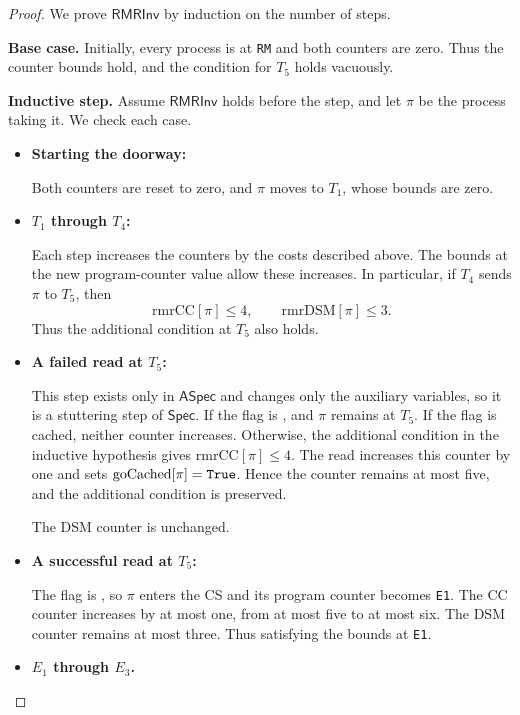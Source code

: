 \documentclass[12pt]{amsproc}
\begin{document}
\begin{proof}
We prove $\mathsf{RMRInv}$ by induction on the number of steps.

\textbf{Base case.}
Initially, every process is at \texttt{RM} and both counters are zero. Thus the counter bounds hold, and the condition for $T_5$ holds vacuously.

\textbf{Inductive step.}
Assume $\mathsf{RMRInv}$ holds before the step, and let $\pi$ be the process taking it. We check each case.

\begin{itemize}
    \item \textbf{Starting the doorway: }

    Both counters are reset to zero, and $\pi$ moves to $T_1$, whose bounds are zero.

    \item \textbf{$T_1$ through $T_4$:}

    Each step increases the counters by the costs described above. The bounds at the new program-counter value allow these increases. In particular, if $T_4$ sends $\pi$ to
    $T_5$, then
    \[
        \mathrm{rmrCC}[\pi]\le 4,
        \qquad
        \mathrm{rmrDSM}[\pi]\le 3.
    \]
    Thus the additional condition at $T_5$ also holds.

    \item \textbf{A failed read at $T_5$:}

    This step exists only in $\mathsf{ASpec}$ and changes only the auxiliary variables, so it is a stuttering step of $\mathsf{Spec}$. If the flag is \False, and $\pi$ remains at $T_5$. If the flag is cached, neither counter increases. Otherwise, the additional condition in the inductive hypothesis gives $\mathrm{rmrCC}[\pi]\le 4$. The read increases this counter by one and sets $\mathrm{goCached}[\pi]=\texttt{True}$. Hence the counter remains at most five, and the additional condition is preserved. 
    
    The DSM counter is unchanged.

    \item \textbf{A successful read at $T_5$: }

    The flag is \True, so $\pi$ enters the CS and its program counter becomes \texttt{E1}. The CC counter increases by at most one, from at most five to at most six. The DSM counter remains at most three. Thus satisfying the bounds at \texttt{E1}.

    \item \textbf{$E_1$ through $E_3$.}


\end{itemize}
\end{proof}
\end{document}
